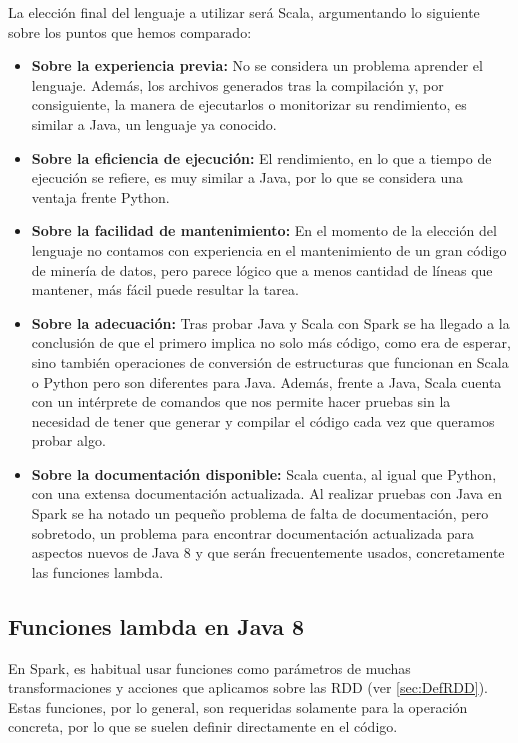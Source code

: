 La elección final del lenguaje a utilizar será Scala, argumentando lo siguiente sobre los puntos que hemos comparado:

\begin{itemize}
	\item \textbf{Sobre la experiencia previa:} No se considera un problema aprender el lenguaje. Además, los archivos generados tras la compilación y, por consiguiente, la manera de ejecutarlos o monitorizar su rendimiento, es similar a Java, un lenguaje ya conocido.
	\item \textbf{Sobre la eficiencia de ejecución:} El rendimiento, en lo que a tiempo de ejecución se refiere, es muy similar a Java, por lo que se considera una ventaja frente Python.
	\item \textbf{Sobre la facilidad de mantenimiento:} En el momento de la elección del lenguaje no contamos con experiencia en el mantenimiento de un gran código de minería de datos, pero parece lógico que a menos cantidad de líneas que mantener, más fácil puede resultar la tarea.	
	\item \textbf{Sobre la adecuación:} Tras probar Java y Scala con Spark se ha llegado a la conclusión de que el primero implica no solo más código, como era de esperar, sino también operaciones de conversión de estructuras que funcionan en Scala o Python pero son diferentes para Java. Además, frente a Java, Scala cuenta con un intérprete de comandos que nos permite hacer pruebas sin la necesidad de tener que generar y compilar el código cada vez que queramos probar algo.
	\item \textbf{Sobre la documentación disponible:} Scala cuenta, al igual que Python, con una extensa documentación actualizada. Al realizar pruebas con Java en Spark se ha notado un pequeño problema de falta de documentación, pero sobretodo, un problema para encontrar documentación actualizada para aspectos nuevos de Java 8 y que serán frecuentemente usados, concretamente las funciones lambda.
\end{itemize}

\newpage
\subsection{Funciones lambda en Java 8 } \label{subsec:ExplLambdaJava}

En Spark, es habitual usar funciones como parámetros de muchas transformaciones y acciones que aplicamos sobre las RDD (ver \ref{sec:DefRDD}). Estas funciones, por lo general, son requeridas solamente para la operación concreta, por lo que se suelen definir directamente en el código.

